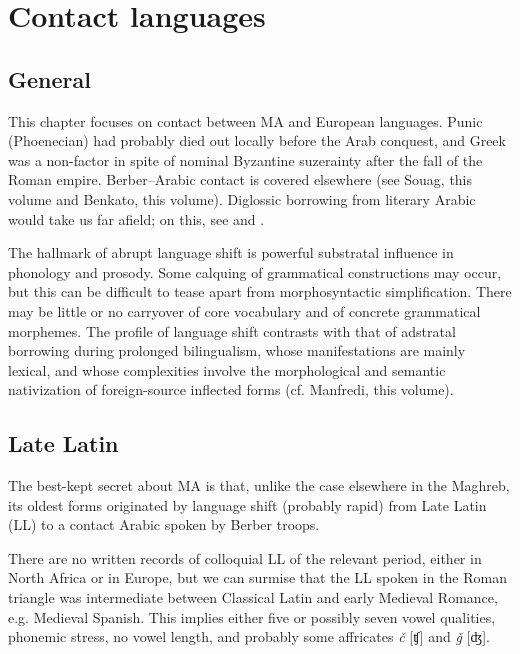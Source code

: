 \documentclass[output=paper]{langsci/langscibook}
\begin{document}
\section{Contact languages}

\subsection{General}

This chapter focuses on contact between MA and European languages. Punic (Phoenecian) had probably died out locally before the Arab conquest, and Greek was a non-factor in spite of nominal Byzantine suzerainty after the fall of the Roman empire. Berber–Arabic contact is covered elsewhere (see Souag, this volume and Benkato, this volume). Diglossic borrowing from literary Arabic would take us far afield; on this, see \citet{Sayahi2014} and \citet{Heath1989}.

The hallmark of abrupt language shift is powerful substratal influence in phonology and prosody. Some calquing of grammatical constructions may occur, but this can be difficult to tease apart from morphosyntactic simplification. There may be little or no carryover of core vocabulary and of concrete grammatical morphemes. The profile of language shift contrasts with that of adstratal borrowing during prolonged bilingualism, whose manifestations are mainly lexical, and whose complexities involve the morphological and semantic nativization of foreign-source inflected forms (cf. Manfredi, this volume).

\subsection{Late Latin}

The best-kept secret about MA is that, unlike the case elsewhere in the Maghreb, its oldest forms originated by language shift (probably rapid) from Late Latin (LL) to a contact Arabic spoken by Berber troops.

There are no written records of colloquial LL of the relevant period, either in North Africa or in Europe, but we can surmise that the LL spoken in the Roman triangle was intermediate between Classical Latin and early Medieval Romance, e.g. Medieval Spanish. This implies either five or possibly seven vowel qualities, phonemic stress, no vowel length, and probably some affricates \textit{č} [ʧ] and \textit{ǧ} [ʤ].
\end{document}
